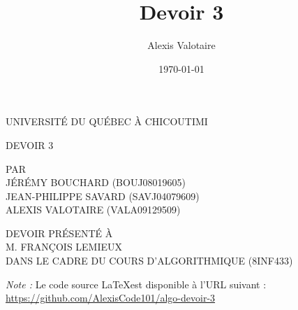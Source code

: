 \documentclass[12pt]{article}
\title{Devoir 3}
\author{Alexis Valotaire}
\date{\today}
\begin{document}
\begin{titlepage}
	\doublespacing
	\centering

	UNIVERSITÉ DU QUÉBEC À CHICOUTIMI \\

	\vspace{4.7cm}

	DEVOIR 3 \\

	\vspace{4.7cm}

	PAR \\
	JÉRÉMY BOUCHARD (BOUJ08019605) \\
	JEAN-PHILIPPE SAVARD (SAVJ04079609) \\
	ALEXIS VALOTAIRE (VALA09129509) \\

	\vspace{4.7cm}

	DEVOIR PRÉSENTÉ À \\
	M. FRANÇOIS LEMIEUX \\
	DANS LE CADRE DU COURS D'ALGORITHMIQUE (8INF433)
\end{titlepage}

\newpage

\textit{Note :} Le code source \LaTeX \:est disponible à l'URL suivant : \\
\url{https://github.com/AlexisCode101/algo-devoir-3}

\newpage

\onehalfspacing



\newpage



\newpage



\newpage


\end{document}
